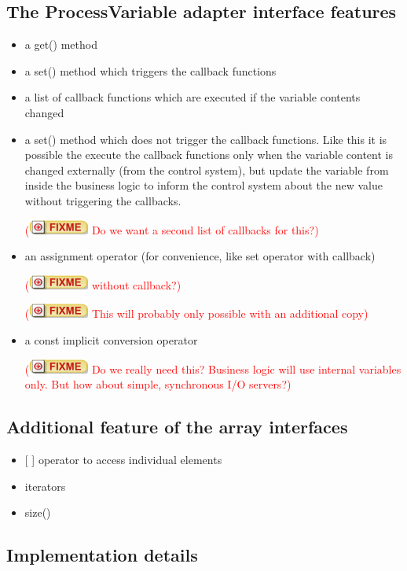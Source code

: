 \documentclass[11pt,a4paper]{scrartcl}
\newcounter{nFixmes}
\newcommand{\fixme}[1]{\addtocounter{nFixmes}{1}\textcolor{red}{(\includegraphics[height=2ex]{fixme} #1)}\xspace}
\begin{document}
\subsection{The ProcessVariable adapter interface features}
\begin{itemize}
\item a get() method
\item a set() method which triggers the callback functions
\item a list of callback functions which are executed if the variable contents changed
\item a set() method which does not trigger the callback functions. Like this it is possible the execute the callback functions only when the variable content is changed externally (from the control system), but update the variable from inside the business logic to inform the control system about the new value without triggering the callbacks.
  \fixme{Do we want a second list of callbacks for this?}
\item an assignment operator (for convenience, like set operator with callback) \fixme{without callback?} \fixme{This will probably only possible with an additional copy}
\item a const implicit conversion operator \fixme{Do we really need this? Business logic will use internal variables only. But how about simple, synchronous I/O servers?}
\end{itemize}

\subsection{Additional feature of the array interfaces}

\begin{itemize}
\item {[ ]} operator to access individual elements
\item iterators
\item size()
\end{itemize}

\subsection{Implementation details}
\end{document}
